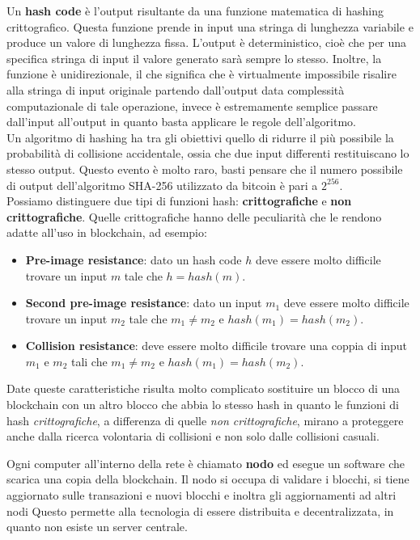 Un \textbf{hash code} è l'output risultante da una funzione matematica di
hashing crittografico. Questa funzione prende in input una stringa di lunghezza
variabile e produce un valore di lunghezza fissa. L'output è deterministico,
cioè che per una specifica stringa di input il valore generato sarà sempre lo
stesso. Inoltre, la funzione è unidirezionale, il che significa che è
virtualmente impossibile risalire alla stringa di input originale partendo
dall'output data complessità computazionale di tale operazione, invece è
estremamente semplice passare dall'input all'output in quanto basta applicare
le regole dell'algoritmo. \\
Un algoritmo di hashing ha tra gli obiettivi quello di ridurre il più possibile
la probabilità di collisione accidentale, ossia che due input differenti
restituiscano lo stesso output. Questo evento è molto raro, basti pensare che
il numero possibile di output dell'algoritmo SHA-256 utilizzato da bitcoin è
pari a $2^{256}$. \\ Possiamo distinguere due tipi di funzioni hash:
\textbf{crittografiche} e \textbf{non crittografiche}. Quelle crittografiche
hanno delle peculiarità che le rendono adatte all'uso in blockchain, ad
esempio:
\begin {itemize}
    \item \textbf{Pre-image resistance}: dato un hash code $h$ deve essere
        molto difficile trovare un input $m$ tale che $h = hash(m)$.
    \item \textbf{Second pre-image resistance}: dato un input $m_1$ deve
        essere molto difficile trovare un input $m_2$ tale che $m_1 \neq m_2$
        e $hash(m_1) = hash(m_2)$.
    \item \textbf{Collision resistance}: deve essere molto difficile trovare
        una coppia di input $m_1$ e $m_2$ tali che $m_1 \neq m_2$ e $hash(m_1)
        = hash(m_2)$.
\end {itemize}
Date queste caratteristiche risulta molto complicato sostituire un blocco di una
blockchain con un altro blocco che abbia lo stesso hash in quanto le funzioni
di hash \textit{crittografiche}, a differenza di quelle \textit{non
crittografiche}, mirano a proteggere anche dalla ricerca volontaria di
collisioni e non solo dalle collisioni casuali. 

Ogni computer all'interno della rete è chiamato \textbf{nodo} ed esegue un
software che scarica una copia della blockchain. Il nodo si occupa di validare
i blocchi, si tiene aggiornato sulle transazioni e nuovi blocchi e inoltra gli
aggiornamenti ad altri nodi Questo permette alla tecnologia di essere
distribuita e decentralizzata, in quanto non esiste un server centrale.

